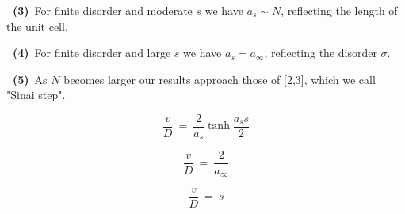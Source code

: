 \documentclass[12pt,fleqn]{seminar}
\begin{document}
{\bf \ (3)}~For finite disorder and moderate $s$ we have ${a_s \sim N}$, reflecting the length of the unit cell.
%

{\bf \ (4)}~For finite disorder and large $s$ we have ${a_s=a_{\infty}}$, reflecting the disorder $\sigma$. 
%

{\bf \ (5)}~As $N$ becomes larger our results approach those of [2,3], which we call "Sinai step".



\esl

\bslD



\bmp{0.4\hsize}


\smp{0.35\hsize}

\Up\Up
\[  \frac{v}{D} \ = \ \frac{2}{a_{s}}\tanh\frac{a_s s}{2} \]

\smp{0.2\hsize}


\emp

\bmp{0.4\hsize}


\smp{0.35\hsize}

\Up\Up
\[ \frac{v}{D} \ = \ \frac{2}{a_{\infty}} \]

\smp{0.2\hsize}


\emp



\bmp{0.4\hsize}


\smp{0.35\hsize}

\Up\Up
\[ \frac{v}{D} \ = \ s \]

\smp{0.2\hsize}

\

\emp



\Dn\Dn

{\Huge
{} \ \ \ \ \ \ \ 
}

\Dn


\esl

\bslD
\end{document}
